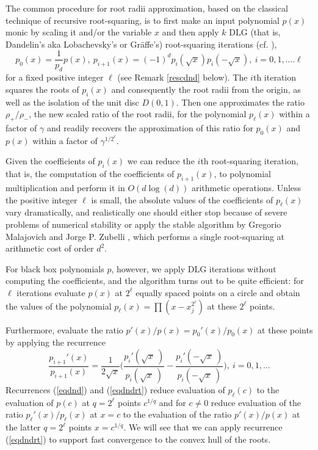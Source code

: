 \documentclass[sigconf]{acmart}
\begin{document}
 The common procedure for root radii  approximation, based on the classical technique of recursive root-squaring, is to first make an input polynomial $p(x)$ monic by scaling it and/or the variable
  $x$ and then
 apply $k$ DLG (that is, Dandelin's aka
Lobachevsky's or Gr{\"a}ffe's) root-squaring iterations
(cf. \cite{10.2307/2310626}),
\begin{equation}\label{eqdnd}
 p_0(x)=\frac{1}{p_d}p(x),~p_{i+1}(x)=(-1)^ dp_i(\sqrt x)
p_i(-\sqrt x),~i=0,1,\dots.\ell
\end{equation}
for a fixed positive integer $\ell$
(see Remark \ref{rescdnd} below).
The $i$th  iteration squares the roots of $p_i(x)$ and
consequently the root radii from the origin, as well as
the  isolation of the unit disc $D(0,1)$.
Then one approximates
the ratio  $\rho_+/\rho_-$, the new scaled ratio of the root radii, for the polynomial $p_{\ell}(x)$ within a factor of $\gamma$ and readily recovers the approximation of this ratio for $p_0(x)$ and
$p(x)$ within a factor of
$\gamma^{1/2^{\ell}}$.

Given the coefficients of
$p_i(x)$
we can reduce the $i$th root-squaring iteration, that is, the computation of
the coefficients of  $p_{i+1}(x)$, to polynomial multiplication and perform it in $O(d\log(d))$ arithmetic operations.
Unless the positive integer $\ell$ is small, the absolute values of the coefficients
of $p_{\ell}(x)$ vary  dramatically, and realistically one should either stop because of severe problems of numerical stability or apply the stable algorithm by Gregorio Malajovich and Jorge  P. Zubelli \cite{Malajovich2001OnTG}, which performs a single root-squaring at  arithmetic cost of order $d^2$.

For black box polynomials $p$, however, we apply
DLG iterations without computing
the coefficients, and the algorithm turns out to be quite efficient:
 for $\ell$ iterations  evaluate
 $p(x)$ at  $2^{\ell}$ equally spaced points  on a circle and obtain
 the values of the polynomial $p_{\ell}(x)=\prod\left(x-x_j^{2^{\ell}}\right)$
 at these $2^{\ell}$ points.

Furthermore,  evaluate the ratio
$p'(x)/p(x)=p_0'(x)/p_0(x)$
at these points by applying
the recurrence
 \begin{equation}\label{eqdndrt} \frac{p_{i+1}'(x)}{p_{i+1}(x)}=\frac{1}{2\sqrt x}\Big(\frac{p_{i}'(\sqrt x~)}{p_{i}(\sqrt x~)}-\frac{p_{i}'(-\sqrt x~)}{p_{i}(-\sqrt x~)}\Big),~i=0,1,\dots
\end{equation}
Recurrences (\ref{eqdnd}) and (\ref{eqdndrt}) reduce evaluation  of  $p_{\ell}(c)$ to the evaluation of $p(c)$ at  $q=2^{\ell}$  points
$c^{1/q}$ and  for $c\neq 0$ reduce evaluation  of
 the ratio
$p_{\ell}'(x)/p_{\ell}(x)$ at $x=c$ to the evaluation
of the ratio
$p'(x)/p(x)$ at the latter $q=2^{\ell}$ points $x=c^{1/q}$.
We will see that we can apply  recurrence (\ref{eqdndrt})
to support fast convergence to the convex hull of the roots.
\end{document}
